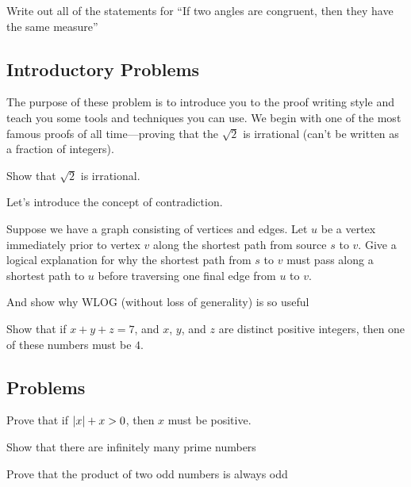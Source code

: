 \begin{problem}
Write out all of the statements for ``If two angles are congruent, then they have the same measure''
\end{problem}

\subsection{Introductory Problems}
The purpose of these problem is to introduce you to the proof writing style and teach you some tools and techniques you can use. We begin with one of the most famous proofs of all time---proving that the $\sqrt{2}$ is irrational (can't be written as a fraction of integers).

\begin{problem}
Show that $\sqrt{2}$ is irrational.
\end{problem}

Let's introduce the concept of contradiction.

\begin{problem}
Suppose we have a graph consisting of vertices and edges. Let $u$ be a vertex immediately prior to vertex $v$ along the shortest path from source $s$ to $v$. Give a logical explanation for why the shortest path from $s$ to $v$ must pass along a shortest path to $u$ before traversing one final edge from $u$ to $v$.
\end{problem}

And show why WLOG (without loss of generality) is so useful

\begin{problem}
Show that if $x+y+z=7$, and $x$, $y$, and $z$ are distinct positive integers, then one of these numbers must be $4$.
\end{problem}

\subsection{Problems}
\begin{problem}
Prove that if $\abs{x}+x>0$, then $x$ must be positive.
\end{problem}

\begin{problem}
Show that there are infinitely many prime numbers
\end{problem}

\begin{problem}
Prove that the product of two odd numbers is always odd
\end{problem}

